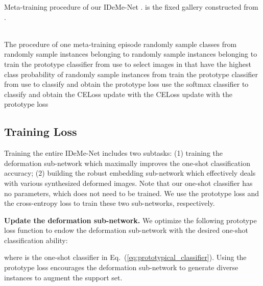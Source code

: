 \documentclass[10pt,letterpaper,twocolumn]{article}
\begin{document}
\begin{algorithm}    	 
\caption{Meta-training procedure of our IDeMe-Net .  is the fixed gallery constructed from .}\label{alg}    \begin{algorithmic}[1]   	  \\The procedure of one meta-training episode	
	 \State  randomly sample  classes from        	
	 \State  randomly sample instances belonging to       		
\State  randomly sample instances belonging to      
     		 \State train the prototype classifier  from     		 
\State  {}       		
\State use  to select  images in  that have the highest class probability of           		 
\State  randomly sample instances from               			 	
\State                			 	
\State         
		\EndFor{}  		 
	\EndFor{}       		 
\EndFor{}              	
	\State train the prototype classifier  from        	 
	\State use  to classify  and obtain the prototype loss       	
	\State use the softmax classifier to classify  and obtain the CELoss       	
	\State update  with the CELoss       		
\State update  with the prototype loss                    
	 	\EndProcedure     	
\end{algorithmic} 

\end{algorithm}




\subsection{Training Loss}
Training the entire IDeMe-Net includes two subtasks: (1) training
the deformation sub-network which maximally improves the one-shot
classification accuracy; (2) building the robust embedding sub-network
which effectively deals with various synthesized deformed images.
Note that our one-shot classifier has no parameters, which does not
need to be trained. We use the prototype loss and the cross-entropy
loss to train these two sub-networks, respectively.

\noindent \textbf{Update the deformation sub-network.} We optimize
the following prototype loss function to endow the deformation
sub-network with the desired one-shot classification ability:

\noindent where 
is the one-shot classifier in Eq.~(\ref{eq:prototypical_classifier}).
Using the prototype loss encourages the deformation sub-network to generate diverse instances to augment the support set.
\end{document}
